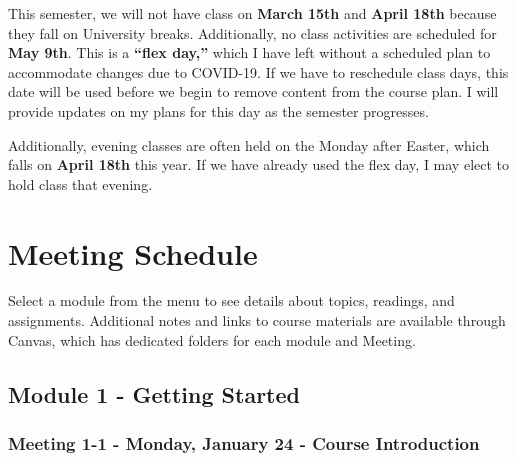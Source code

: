\documentclass[
]{book}
\begin{document}
This semester, we will not have class on \textbf{March 15th} and \textbf{April 18th} because they fall on University breaks. Additionally, no class activities are scheduled for \textbf{May 9th}. This is a \textbf{``flex day,''} which I have left without a scheduled plan to accommodate changes due to COVID-19. If we have to reschedule class days, this date will be used before we begin to remove content from the course plan. I will provide updates on my plans for this day as the semester progresses.

Additionally, evening classes are often held on the Monday after Easter, which falls on \textbf{April 18th} this year. If we have already used the flex day, I may elect to hold class that evening.

\hypertarget{meeting-schedule}{%
\chapter{Meeting Schedule}\label{meeting-schedule}}

Select a module from the menu to see details about topics, readings, and assignments. Additional notes and links to course materials are available through Canvas, which has dedicated folders for each module and Meeting.

\hypertarget{module-1---getting-started}{%
\section*{Module 1 - Getting Started}\label{module-1---getting-started}}

\hypertarget{meeting-1-1---monday-january-24---course-introduction}{%
\subsection*{Meeting 1-1 - Monday, January 24 - Course Introduction}\label{meeting-1-1---monday-january-24---course-introduction}}
\end{document}
